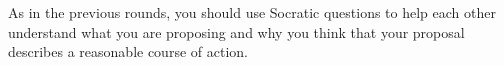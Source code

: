 \documentclass[a6paper, 11pt, parskip=half, DIV=15]{scrartcl}
\begin{document}
\vfill

\begin{center}
\end{center}

\vfill

As in the previous rounds, you should use Socratic questions to help each other understand what you are proposing and why you think that your proposal describes a reasonable course of action.
\end{document}
